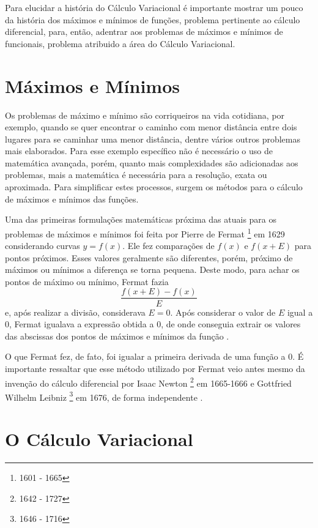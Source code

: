 \documentclass[
	12pt,				%
	openright,			%
    twoside,			%
	a4paper,			%
	english,			%
	french,				%
	spanish,			%
	brazil				%
	]{abntex2}
\numberwithin{lema}{chapter}
\numberwithin{teorema}{chapter}
\numberwithin{definicao}{chapter}
\numberwithin{exemplo}{chapter}
\numberwithin{figure}{chapter}
\newcommand{\bdDate}[2]{
	\footnote{\gtrsymBorn\text{ }#1 - \gtrsymDied\text{ }#2}
}
\begin{document}
Para elucidar a história do Cálculo Variacional é importante mostrar um pouco da história dos máximos e mínimos de funções, problema pertinente ao cálculo diferencial, para, então, adentrar aos problemas de máximos e mínimos de funcionais, problema atribuido a área do Cálculo Variacional.

\section{Máximos e Mínimos}

Os problemas de máximo e mínimo são corriqueiros na vida cotidiana, por exemplo, quando se quer encontrar o caminho com menor distância entre dois lugares para se caminhar uma menor distância, dentre vários outros problemas mais elaborados. Para esse exemplo específico não é necessário o uso de matemática avançada, porém, quanto mais complexidades são adicionadas aos problemas, mais a matemática é necessária para a resolução, exata ou aproximada. Para simplificar estes processos, surgem os métodos para o cálculo de máximos e mínimos das funções.

Uma das primeiras formulações matemáticas próxima das atuais para os problemas de máximos e mínimos foi feita por Pierre de Fermat\bdDate{1601}{1665} em 1629 considerando curvas $y=f(x)$. Ele fez comparações de $f(x)$ e $f(x+E)$ para pontos próximos. Esses valores geralmente são diferentes, porém, próximo de máximos ou mínimos a diferença se torna pequena. Deste modo, para achar os pontos de máximo ou mínimo, Fermat fazia
$$
	\frac{f(x+E)-f(x)}{E}
$$
e, após realizar a divisão, considerava $E=0$. Após considerar o valor de $E$ igual a $0$, Fermat igualava a expressão obtida a $0$, de onde conseguia extrair os valores das abscissas dos pontos de máximos e mínimos da função \cite{boyer}.

O que Fermat fez, de fato, foi igualar a primeira derivada de uma função a $0$. É importante ressaltar que esse método utilizado por Fermat veio antes mesmo da invenção do cálculo diferencial por Isaac Newton\bdDate{1642}{1727} em 1665-1666 e Gottfried Wilhelm Leibniz\bdDate{1646}{1716} em 1676, de forma independente \cite{boyer}.


\section{O Cálculo Variacional}
\end{document}
